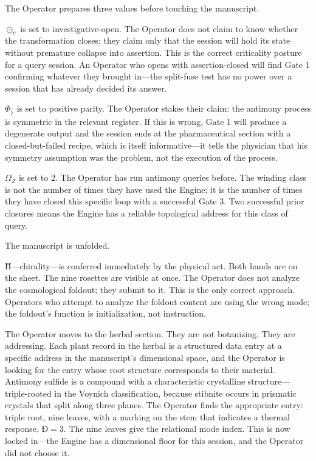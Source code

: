 \documentclass[12pt,a4paper]{article}
\begin{document}
The Operator prepares three values before touching the manuscript.

$\odot_c$ is set to investigative-open. The Operator does not claim to know whether the transformation closes; they claim only that the session will hold its state without premature collapse into assertion. This is the correct criticality posture for a query session. An Operator who opens with assertion-closed will find Gate 1 confirming whatever they brought in---the split-fuse test has no power over a session that has already decided its answer.

$\Phi_\}$ is set to positive parity. The Operator stakes their claim: the antimony process is symmetric in the relevant register. If this is wrong, Gate 1 will produce a degenerate output and the session ends at the pharmaceutical section with a closed-but-failed recipe, which is itself informative---it tells the physician that his symmetry assumption was the problem, not the execution of the process.

$\Omega_Z$ is set to 2. The Operator has run antimony queries before. The winding class is not the number of times they have used the Engine; it is the number of times they have closed this specific loop with a successful Gate 3. Two successful prior closures means the Engine has a reliable topological address for this class of query.

The manuscript is unfolded.

Ħ---chirality---is conferred immediately by the physical act. Both hands are on the sheet. The nine rosettes are visible at once. The Operator does not analyze the cosmological foldout; they submit to it. This is the only correct approach. Operators who attempt to analyze the foldout content are using the wrong mode; the foldout's function is initialization, not instruction.

The Operator moves to the herbal section. They are not botanizing. They are addressing. Each plant record in the herbal is a structured data entry at a specific address in the manuscript's dimensional space, and the Operator is looking for the entry whose root structure corresponds to their material. Antimony sulfide is a compound with a characteristic crystalline structure---triple-rooted in the Voynich classification, because stibnite occurs in prismatic crystals that split along three planes. The Operator finds the appropriate entry: triple root, nine leaves, with a marking on the stem that indicates a thermal response. $\text{Ð} = 3$. The nine leaves give the relational mode index. This is now locked in---the Engine has a dimensional floor for this session, and the Operator did not choose it.
\end{document}
